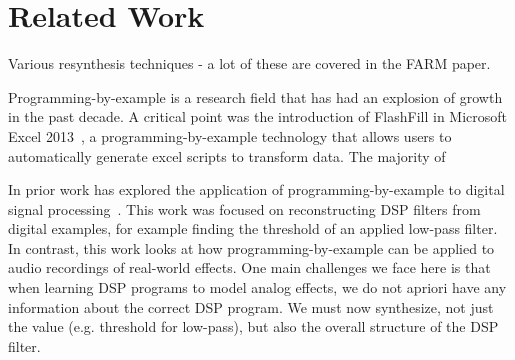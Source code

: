 \section{Related Work}

Various resynthesis techniques - a lot of these are covered in the FARM paper.

Programming-by-example is a research field that has had an explosion of growth in the past decade. 
A critical point was the introduction of FlashFill in Microsoft Excel 2013~\cite{GulwaniHS12}, a programming-by-example technology that allows users to automatically generate excel scripts to transform data.
The majority of

In prior work has explored the application of programming-by-example to digital signal processing~\cite{SantolucitoFARM}.
This work was focused on reconstructing DSP filters from digital examples, for example finding the threshold of an applied low-pass filter.
In contrast, this work looks at how programming-by-example can be applied to audio recordings of real-world effects.
One main challenges we face here is that when learning DSP programs to model analog effects, we do not apriori have any information about the correct DSP program.
We must now synthesize, not just the value (e.g. threshold for low-pass), but also the overall structure of the DSP filter.